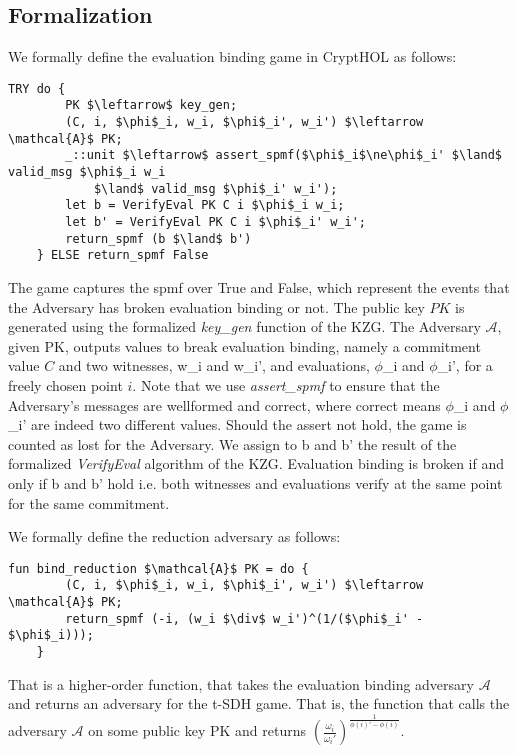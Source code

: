 \subsection{Formalization}
\label{security:binding:formalization}
We formally define the evaluation binding game in CryptHOL as follows:
\begin{lstlisting}[language=isabelle]
    TRY do {
        PK $\leftarrow$ key_gen;
        (C, i, $\phi$_i, w_i, $\phi$_i', w_i') $\leftarrow \mathcal{A}$ PK;
        _::unit $\leftarrow$ assert_spmf($\phi$_i$\ne\phi$_i' $\land$ valid_msg $\phi$_i w_i 
            $\land$ valid_msg $\phi$_i' w_i');
        let b = VerifyEval PK C i $\phi$_i w_i;
        let b' = VerifyEval PK C i $\phi$_i' w_i';
        return_spmf (b $\land$ b')
    } ELSE return_spmf False
\end{lstlisting}
The game captures the spmf over True and False, which represent the events that the Adversary has broken evaluation binding or not.
The public key $PK$ is generated using the formalized \textit{key\_gen} function of the KZG. The Adversary $\mathcal{A}$, given PK, outputs values to break evaluation binding, namely a commitment value $C$ and two witnesses, w\_i and w\_i', and evaluations, $\phi$\_i and $\phi$\_i',  for a freely chosen point $i$. 
Note that we use \textit{assert\_spmf} to ensure that the Adversary's messages are wellformed and correct, where correct means $\phi$\_i and $\phi$\_i' are indeed two different values. Should the assert not hold, the game is counted as lost for the Adversary.
We assign to b and b' the result of the formalized \textit{VerifyEval} algorithm of the KZG. Evaluation binding is broken if and only if b and b' hold i.e. both witnesses and evaluations verify at the same point for the same commitment.

We formally define the reduction adversary as follows:
\begin{lstlisting}[language=isabelle]
    fun bind_reduction $\mathcal{A}$ PK = do {
        (C, i, $\phi$_i, w_i, $\phi$_i', w_i') $\leftarrow \mathcal{A}$ PK;
        return_spmf (-i, (w_i $\div$ w_i')^(1/($\phi$_i' - $\phi$_i)));
    }
\end{lstlisting}
That is a higher-order function, that takes the evaluation binding adversary $\mathcal{A}$ and returns an adversary for the t-SDH game.
That is, the function that calls the adversary $\mathcal{A}$ on some public key PK and returns $(\frac{\omega_i}{\omega_i'})^{\frac{1}{\phi(i)'-\phi(i)}}$. 

